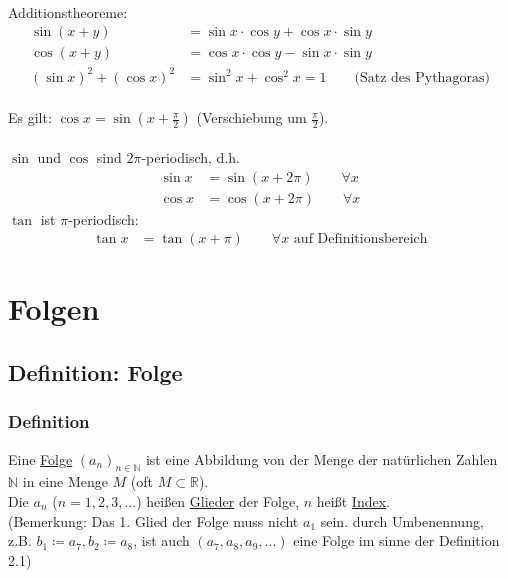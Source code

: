 \documentclass[12pt, titlepage]{article}
\newcommand{\R}{\mathds{R}}
\newcommand{\N}{\mathds{N}}
\renewcommand{\*}{\cdot}
\begin{document}
\begin{itemize}
\\
	Additionstheoreme:
	\begin{align*}
		\sin (x+y)&=\sin x\*\cos y+\cos x\* \sin y\\
		\cos(x+y)&=\cos x\*\cos y-\sin x\*\sin y\\
		(\sin x)^2+(\cos x)^2&=\sin^2x+\cos^2x=1\qquad\textrm{(Satz des Pythagoras)}
	\end{align*}
	\\
	Es gilt: $\cos x=\sin (x+\frac{\pi}{2})$ (Verschiebung um $\frac{\pi}{2}$).\\
	\\
	$\sin$ und $\cos$ sind $2\pi$-periodisch, d.h.
	\begin{align*}
		\sin x&=\sin(x+2\pi)\qquad\forall x\\
		\cos x&=\cos (x+2\pi)\qquad\forall x
	\end{align*}
	$\tan$ ist $\pi$-periodisch:
	\begin{align*}
		\tan x&=\tan(x+\pi)\qquad\forall x\textrm{ auf Definitionsbereich}
	\end{align*}
	\end{itemize}
	\newpage
	\section{Folgen}
	\subsection{Definition: Folge}
	\subsubsection*{Definition}
	Eine \underline{Folge} $(a_n)_{n\in\N}$ ist eine Abbildung von der Menge der natürlichen Zahlen $\N$ in eine Menge $M$ (oft $M\subset \R$).\\
	Die $a_n$ ($n=1,2,3,...$) heißen \underline{Glieder} der Folge, $n$ heißt \underline{Index}.\\
	(Bemerkung: Das 1. Glied der Folge muss nicht $a_1$ sein. durch Umbenennung, z.B. $b_1\coloneqq a_7, b_2\coloneqq a_8$, ist auch $(a_7, a_8, a_9, ...)$ eine Folge im sinne der Definition 2.1)
\end{document}

